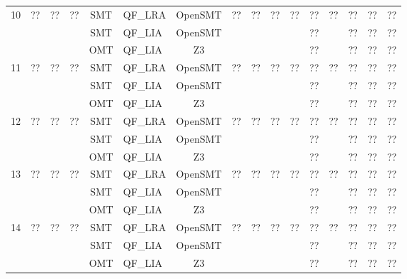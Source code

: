 \begin{landscape}
\begin{longtable}{|c|c|c|c|c|l|c|c|c|c|c|c|c|c|c|c|}
            \multirow{3}{*}{10} & \multirow{3}{*}{??} & \multirow{3}{*}{??} & \multirow{3}{*}{??} & SMT & QF\_LRA & OpenSMT & \multirow{3}{*}{??} & \multirow{3}{*}{??} & \multirow{3}{*}{??} & \multirow{3}{*}{??} & ?? & \multirow{3}{*}{??} & ?? & ?? & ?? \\
            & & & & SMT & QF\_LIA & OpenSMT & & & & & ?? & & ?? & ?? & ?? \\
            & & & & OMT & QF\_LIA & Z3 & & & & & ?? & & ?? & ?? & ?? \\
            \hline
            \multirow{3}{*}{11} & \multirow{3}{*}{??} & \multirow{3}{*}{??} & \multirow{3}{*}{??} & SMT & QF\_LRA & OpenSMT & \multirow{3}{*}{??} & \multirow{3}{*}{??} & \multirow{3}{*}{??} & \multirow{3}{*}{??} & ?? & \multirow{3}{*}{??} & ?? & ?? & ?? \\
            & & & & SMT & QF\_LIA & OpenSMT & & & & & ?? & & ?? & ?? & ?? \\
            & & & & OMT & QF\_LIA & Z3 & & & & & ?? & & ?? & ?? & ?? \\
            \hline
            \multirow{3}{*}{12} & \multirow{3}{*}{??} & \multirow{3}{*}{??} & \multirow{3}{*}{??} & SMT & QF\_LRA & OpenSMT & \multirow{3}{*}{??} & \multirow{3}{*}{??} & \multirow{3}{*}{??} & \multirow{3}{*}{??} & ?? & \multirow{3}{*}{??} & ?? & ?? & ?? \\
            & & & & SMT & QF\_LIA & OpenSMT & & & & & ?? & & ?? & ?? & ?? \\
            & & & & OMT & QF\_LIA & Z3 & & & & & ?? & & ?? & ?? & ?? \\
            \hline
            \multirow{3}{*}{13} & \multirow{3}{*}{??} & \multirow{3}{*}{??} & \multirow{3}{*}{??} & SMT & QF\_LRA & OpenSMT & \multirow{3}{*}{??} & \multirow{3}{*}{??} & \multirow{3}{*}{??} & \multirow{3}{*}{??} & ?? & \multirow{3}{*}{??} & ?? & ?? & ?? \\
            & & & & SMT & QF\_LIA & OpenSMT & & & & & ?? & & ?? & ?? & ?? \\
            & & & & OMT & QF\_LIA & Z3 & & & & & ?? & & ?? & ?? & ?? \\
            \hline
            \multirow{3}{*}{14} & \multirow{3}{*}{??} & \multirow{3}{*}{??} & \multirow{3}{*}{??} & SMT & QF\_LRA & OpenSMT & \multirow{3}{*}{??} & \multirow{3}{*}{??} & \multirow{3}{*}{??} & \multirow{3}{*}{??} & ?? & \multirow{3}{*}{??} & ?? & ?? & ?? \\
            & & & & SMT & QF\_LIA & OpenSMT & & & & & ?? & & ?? & ?? & ?? \\
            & & & & OMT & QF\_LIA & Z3 & & & & & ?? & & ?? & ?? & ?? \\

\end{longtable}
\end{landscape}
